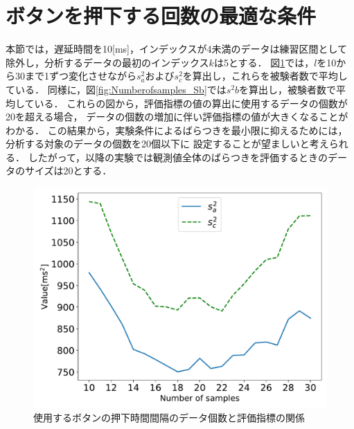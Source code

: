 \section{ボタンを押下する回数の最適な条件}
本節では，遅延時間を10[ms]，インデックスが4未満のデータは練習区間として除外し，分析するデータの最初のインデックス$k$は5とする．
図\ref{fig:NumberofSamples_Sa_Sc}では，$l$を10から30まで1ずつ変化させながら$s^2_{a}$および$s^2_{c}$を算出し，これらを被験者数で平均している．
同様に，図\ref{fig:Numberofsamples_Sb}では$s^2{b}$を算出し，被験者数で平均している．
これらの図から，評価指標の値の算出に使用するデータの個数が20を超える場合，
データの個数の増加に伴い評価指標の値が大きくなることがわかる．
この結果から，実験条件によるばらつきを最小限に抑えるためには，分析する対象のデータの個数を20個以下に
設定することが望ましいと考えられる．
したがって，以降の実験では観測値全体のばらつきを評価するときのデータのサイズは20とする．
\begin{figure}[bt]
  \centering
  \includegraphics[scale=0.6]{figures/Yobi/Var/NumberOfSamples_varSaSc.pdf}
  \caption{使用するボタンの押下時間間隔のデータ個数と評価指標の関係}
  \label{fig:NumberofSamples_Sa_Sc}
\end{figure}
